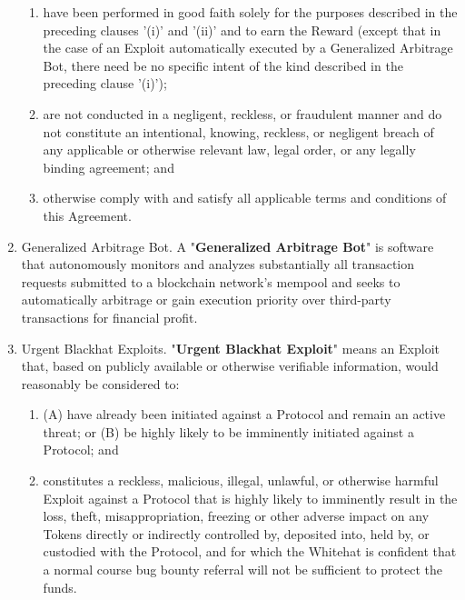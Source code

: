 \documentclass{article}
\begin{document}
\begin{enumerate}
\begin{enumerate}
              \item have been performed in good faith solely for the purposes described in the preceding clauses '(i)' and '(ii)' and to earn the Reward (except that in the case of an Exploit automatically executed by a Generalized Arbitrage Bot, there need be no specific intent of the kind described in the preceding clause '(i)');

              \item are not conducted in a negligent, reckless, or fraudulent manner and do not constitute an intentional, knowing, reckless, or negligent breach of any applicable or otherwise relevant law, legal order, or any legally binding agreement; and

              \item otherwise comply with and satisfy all applicable terms and conditions of this Agreement.

          \end{enumerate}

    \item Generalized Arbitrage Bot. A "\textbf{Generalized Arbitrage Bot}" is software that autonomously monitors and analyzes substantially all transaction requests submitted to a blockchain network's mempool and seeks to automatically arbitrage or gain execution priority over third-party transactions for financial profit.

    \item Urgent Blackhat Exploits. "\textbf{Urgent Blackhat Exploit}" means an Exploit that, based on publicly available or otherwise verifiable information, would reasonably be considered to:

          \begin{enumerate}

              \item (A) have already been initiated against a Protocol and remain an active threat; or (B) be highly likely to be imminently initiated against a Protocol; and

              \item constitutes a reckless, malicious, illegal, unlawful, or otherwise harmful Exploit against a Protocol that is highly likely to imminently result in the loss, theft, misappropriation, freezing or other adverse impact on any Tokens directly or indirectly controlled by, deposited into, held by, or custodied with the Protocol, and for which the Whitehat is confident that a normal course bug bounty referral will not be sufficient to protect the funds.
          \end{enumerate}
\end{enumerate}
\end{document}
